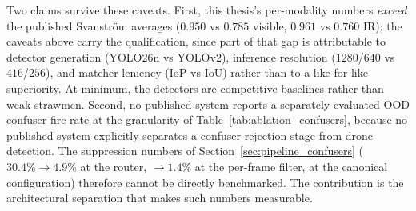 Two claims survive these caveats. First, this thesis's per-modality numbers \emph{exceed} the published Svanstr\"om averages ($0.950$ vs $0.785$ visible, $0.961$ vs $0.760$ IR); the caveats above carry the qualification, since part of that gap is attributable to detector generation (YOLO26n vs YOLOv2), inference resolution ($1280$/$640$ vs $416$/$256$), and matcher leniency (IoP vs IoU) rather than to a like-for-like superiority. At minimum, the detectors are competitive baselines rather than weak strawmen. Second, no published system reports a separately-evaluated OOD confuser fire rate at the granularity of Table~\ref{tab:ablation_confusers}, because no published system explicitly separates a confuser-rejection stage from drone detection. The suppression numbers of Section~\ref{sec:pipeline_confusers} ($30.4\% \to 4.9\%$ at the router, $\to 1.4\%$ at the per-frame filter, at the canonical configuration) therefore cannot be directly benchmarked. The contribution is the architectural separation that makes such numbers measurable.

